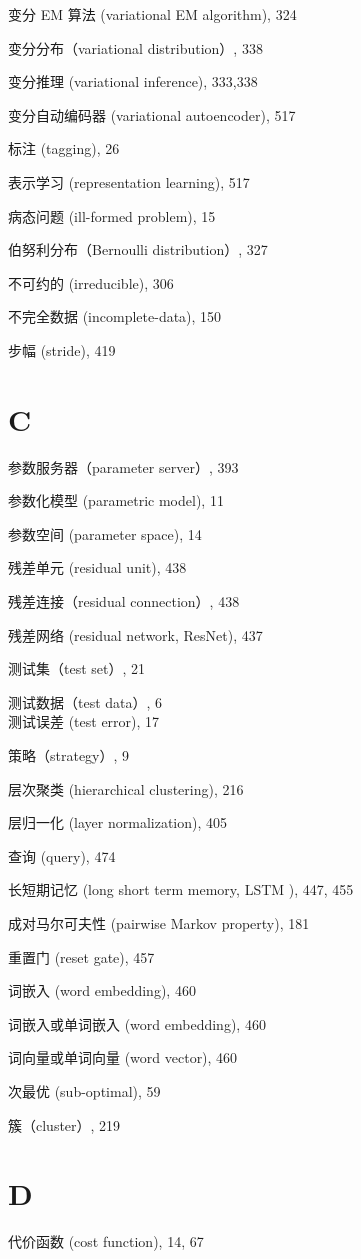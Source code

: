 \documentclass[10pt]{article}
\begin{document}
变分 EM 算法 (variational EM algorithm), 324

变分分布（variational distribution）, 338

变分推理 (variational inference), 333,338

变分自动编码器 (variational autoencoder), 517

标注 (tagging), 26

表示学习 (representation learning), 517

病态问题 (ill-formed problem), 15

伯努利分布（Bernoulli distribution）, 327

不可约的 (irreducible), 306

不完全数据 (incomplete-data), 150

步幅 (stride), 419

\section*{C}
参数服务器（parameter server）, 393

参数化模型 (parametric model), 11

参数空间 (parameter space), 14

残差单元 (residual unit), 438

残差连接（residual connection）, 438

残差网络 (residual network, ResNet), 437

测试集（test set）, 21

测试数据（test data）, 6\\
测试误差 (test error), 17

策略（strategy）, 9

层次聚类 (hierarchical clustering), 216

层归一化 (layer normalization), 405

查询 (query), 474

长短期记忆 (long short term memory, LSTM ), 447, 455

成对马尔可夫性 (pairwise Markov property), 181

重置门 (reset gate), 457

词嵌入 (word embedding), 460

词嵌入或单词嵌入 (word embedding), 460

词向量或单词向量 (word vector), 460

次最优 (sub-optimal), 59

簇（cluster）, 219

\section*{D}
代价函数 (cost function), 14, 67
\end{document}
